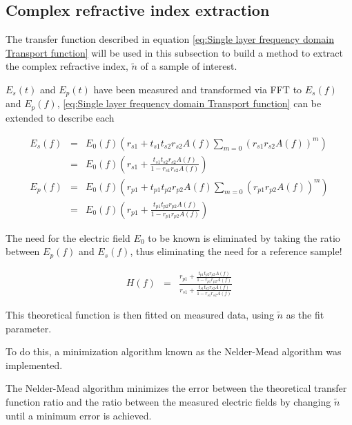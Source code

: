 \subsection{Complex refractive index extraction}
\label{sub:compref}

The transfer function described in equation \ref{eq:Single layer frequency domain Transport function} will be used in this subsection to build a method to extract the complex refractive index, $\widetilde{n}$ of a sample of interest.

$E_{s}(t)$ and $E_{p}(t)$ have been measured and transformed via FFT to $E_{s}(f)$ and $E_{p}(f)$, \ref{eq:Single layer frequency domain Transport function} can be extended to describe each

\begin{eqnarray}
E_{s}(f) &=& E_{0}(f)(r_{s1} + t_{s1}t_{s2}r_{s2}A(f)\sum_{m=0}(r_{s1}r_{s2}A(f))^{m})\nonumber\\
&=& E_{0}(f)\left(r_{s1} + \frac{t_{s1}t_{s2}r_{s2}A(f)}{1 - r_{s1}r_{s2}A(f)}\right)\label{eq:Single layer frequency domain Transport function s-polarization}\\
E_{p}(f) &=& E_{0}(f)(r_{p1} + t_{p1}t_{p2}r_{p2}A(f)\sum_{m=0}(r_{p1}r_{p2}A(f))^{m})\nonumber\\
&=& E_{0}(f)\left(r_{p1} + \frac{t_{p1}t_{p2}r_{p2}A(f)}{1 - r_{p1}r_{p2}A(f)}\right)\label{eq:Single layer frequency domain Transport function p-polarization}
\end{eqnarray}

The need for the electric field $E_{0}$ to be known is eliminated by taking the ratio between $E_{p}(f)$ and $E_{s}(f)$, thus eliminating the need for a reference sample!

\begin{eqnarray}
H(f) &=&  \frac{r_{p1} + \frac{t_{p1}t_{p2}r_{p2}A(f)}{1 - r_{p1}r_{p2}A(f)}}{r_{s1} + \frac{t_{s1}t_{s2}r_{s2}A(f)}{1 - r_{s1}r_{s2}A(f)}}
\label{eq:Transfer Ratio}
\end{eqnarray}

This theoretical function is then fitted on measured data, using $\widetilde{n}$ as the fit parameter.

To do this, a minimization algorithm known as the Nelder-Mead algorithm was implemented.

The Nelder-Mead algorithm minimizes the error between the theoretical transfer function ratio and the ratio between the measured electric fields by changing $\widetilde{n}$ until a minimum error is achieved.

